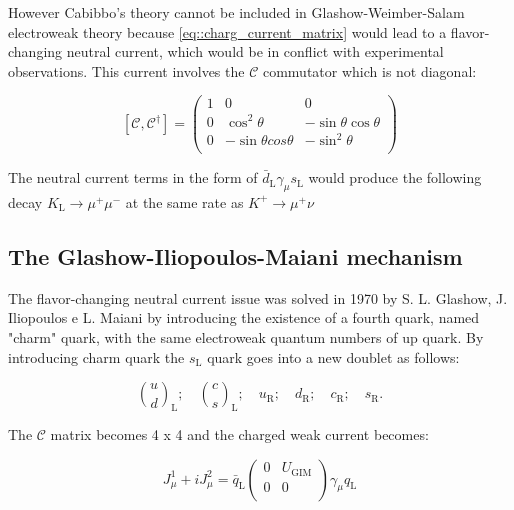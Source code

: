 However Cabibbo's theory cannot be included in Glashow-Weimber-Salam electroweak theory because \autoref{eq::charg_current_matrix} would lead to a flavor-changing neutral current, which would be in conflict with experimental observations. This current involves the $\mathcal{C}$ commutator which is not diagonal:

\begin{equation}
\left[\mathcal{C}, \mathcal{C}^{\dagger} \right]
=
\begin{pmatrix}
1 &0 &0 \\
0 &\cos^{2}\theta &-\sin\theta \cos\theta \\
0 &-\sin\theta cos\theta &-\sin^{2}\theta\\
\end{pmatrix}
\end{equation}

The neutral current terms in the form of $\bar{d}_{\text{L}}\gamma_{\mu}s_{\text{L}}$ would produce the following decay $K_{\text{L}} \longrightarrow \mu^{+}\mu^{-}$ at the same rate as $K^{+} \longrightarrow \mu^{+}\nu$

\subsection{The Glashow-Iliopoulos-Maiani mechanism}

The flavor-changing neutral current issue was solved in 1970 by S. L. Glashow, J. Iliopoulos e L. Maiani \cite{Glashow:1970gm} by introducing the existence of a fourth quark, named "charm" quark, with the same electroweak quantum numbers of up quark. By introducing charm quark the $s_{\text{L}}$ quark goes into a new doublet as follows: 

\begin{equation}
\binom{u}{d}_{\text{L}}; \quad \binom{c}{s}_{\text{L}}; \quad u_{\text{R}}; \quad d_{\text{R}}; \quad c_{\text{R}}; \quad s_{\text{R}}.
\end{equation}

The $\mathcal{C}$ matrix becomes 4 x 4 and the charged weak current becomes:

\begin{equation}
J^{1}_{\mu} + i J^{2}_{\mu} = \bar{q}_{\text{L}} 
\begin{pmatrix}
0 &U_{\text{GIM}} \\
0 &0 \\
\end{pmatrix}
\gamma_{\mu}q_{\text{L}}
\label{eq::cab_current_gim}
\end{equation}

